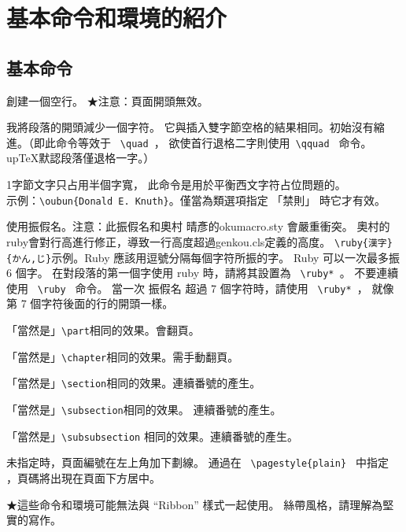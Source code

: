\documentclass[a4,11pt,uplatex,openleft]{jsarticle}
\begin{document}
\section{基本命令和環境的紹介}

\subsection{基本命令}

\begin{biao}[　　　　　　　　]
\item[$\backslash$空行]創建一個空行。 ★注意：頁面開頭無效。
\item[$\backslash$一字下げ]我將段落的開頭減少一個字符。
它與插入雙字節空格的結果相同。初始沒有縮進。（即此命令等效于 \verb+ \quad +，
欲使首行退格二字則使用\verb+ \qquad + 命令。 up\TeX 默認段落僅退格一字。）
\item[$\backslash$oubun]1字節文字只占用半個字寬，
此命令是用於平衡西文字符占位問題的。\\
示例：\verb+\oubun{Donald E. Knuth}+。僅當為類選項指定 「禁則」 時它才有效。
\item[$\backslash$ruby]使用振假名。注意：此振假名和奧村\quad
晴彥的okumacro.sty 會嚴重衝突。
奧村的ruby會對行高進行修正，導致一行高度超過genkou.cls定義的高度。
\verb+\ruby{漢字}{かん,じ}+示例。Ruby 應該用逗號分隔每個字符所振的字。
Ruby 可以一次最多振 6 個字。
在對段落的第一個字使用 ruby 時，請將其設置為 \verb+ \ruby* +。
不要連續使用 \verb+ \ruby + 命令。
當一次 振假名 超過 7 個字符時，請使用 \verb+ \ruby* +，
就像第 7 個字符後面的行的開頭一樣。
\item[$\backslash$part]「當然是」\verb+\part+相同的效果。會翻頁。
\item[$\backslash$chapter]「當然是」\verb+\chapter+相同的效果。需手動翻頁。
\item[$\backslash$section]「當然是」\verb+\section+相同的效果。連續番號的產生。
\item[$\backslash$subsection]「當然是」\verb+\subsection+相同的效果。
連續番號的產生。
\item[$\backslash$subsubsection]「當然是」\verb+\subsubsection+
相同的效果。連續番號的產生。
\item[$\backslash$pagestyle]未指定時，頁面編號在左上角加下劃線。
通過在 \verb+ \pagestyle{plain} + 中指定 ，頁碼將出現在頁面下方居中。
\end{biao}
★這些命令和環境可能無法與 “Ribbon” 樣式一起使用。
絲帶風格，請理解為堅實的寫作。
\end{document}
